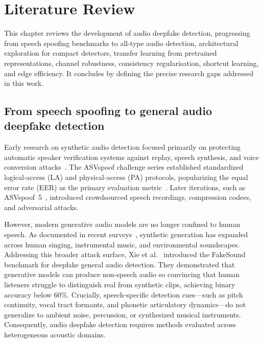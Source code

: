 \documentclass[12pt,a4paper]{report}
\begin{document}
\chapter{Literature Review}
\label{ch:literature}

This chapter reviews the development of audio deepfake detection, progressing from speech spoofing benchmarks to all-type audio detection, architectural exploration for compact detectors, transfer learning from pretrained representations, channel robustness, consistency regularisation, shortcut learning, and edge efficiency. It concludes by defining the precise research gaps addressed in this work.

\section{From speech spoofing to general audio deepfake detection}

Early research on synthetic audio detection focused primarily on protecting automatic speaker verification systems against replay, speech synthesis, and voice conversion attacks~\cite{kinnunen2017detection,wang2020asvspoof}. The ASVspoof challenge series established standardized logical-access (LA) and physical-access (PA) protocols, popularizing the equal error rate (EER) as the primary evaluation metric~\cite{wang2020asvspoof}. Later iterations, such as ASVspoof~5~\cite{wang2025asvspoof5}, introduced crowdsourced speech recordings, compression codecs, and adversarial attacks.

However, modern generative audio models are no longer confined to human speech. As documented in recent surveys~\cite{shaaban2023ieeeAccess,zhang2025sensorsSurvey,alnaqbi2026systematic,nguyenle2026deepfakeSurvey}, synthetic generation has expanded across human singing, instrumental music, and environmental soundscapes. Addressing this broader attack surface, Xie et al.~\cite{xie2024fakesound} introduced the FakeSound benchmark for deepfake general audio detection. They demonstrated that generative models can produce non-speech audio so convincing that human listeners struggle to distinguish real from synthetic clips, achieving binary accuracy below 60\%. Crucially, speech-specific detection cues---such as pitch continuity, vocal tract formants, and phonetic articulatory dynamics---do not generalize to ambient noise, percussion, or synthesized musical instruments. Consequently, audio deepfake detection requires methods evaluated across heterogeneous acoustic domains.
\end{document}
